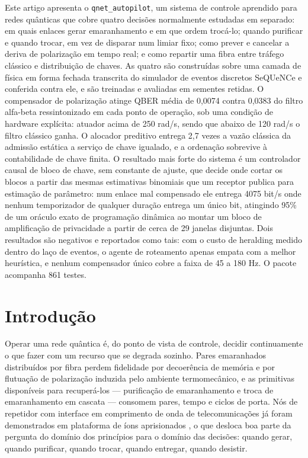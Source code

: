 \documentclass[12pt]{article}
\begin{document}
\begin{resumo}
Este artigo apresenta o \texttt{qnet\_autopilot}, um sistema de controle
aprendido para redes quânticas que cobre quatro decisões normalmente estudadas
em separado: em quais enlaces gerar emaranhamento e em que ordem trocá-lo;
quando purificar e quando trocar, em vez de disparar num limiar fixo; como
prever e cancelar a deriva de polarização em tempo real; e como repartir uma
fibra entre tráfego clássico e distribuição de chaves. As quatro são
construídas sobre uma camada de física em forma fechada transcrita do simulador
de eventos discretos SeQUeNCe e conferida contra ele, e são treinadas e
avaliadas em sementes retidas. O compensador de polarização atinge QBER média
de 0,0074 contra 0,0383 do filtro alfa-beta ressintonizado em cada ponto de
operação, sob uma condição de hardware explícita: atuador acima de 250 rad/s,
sendo que abaixo de 120 rad/s o filtro clássico ganha. O alocador preditivo
entrega 2,7 vezes a vazão clássica da admissão estática a serviço de chave
igualado, e a ordenação sobrevive à contabilidade de chave finita. O resultado
mais forte do sistema é um controlador causal de bloco de chave, sem constante
de ajuste, que decide onde cortar os blocos a partir das mesmas estimativas
binomiais que um receptor publica para estimação de parâmetro: num enlace mal
compensado ele entrega 4075 bit/s onde nenhum temporizador de qualquer duração
entrega um único bit, atingindo 95\% de um oráculo exato de programação
dinâmica ao montar um bloco de amplificação de privacidade a partir de cerca de
29 janelas disjuntas. Dois resultados são negativos e reportados como tais: com
o custo de heralding medido dentro do laço de eventos, o agente de roteamento
apenas empata com a melhor heurística, e nenhum compensador único cobre a faixa
de 45 a 180 Hz. O pacote acompanha 861 testes.
\end{resumo}


\section{Introdução}

Operar uma rede quântica é, do ponto de vista de controle, decidir
continuamente o que fazer com um recurso que se degrada sozinho. Pares
emaranhados distribuídos por fibra perdem fidelidade por decoerência de memória
e por flutuação de polarização induzida pelo ambiente termomecânico, e as
primitivas disponíveis para recuperá-los --- purificação de emaranhamento
\cite{bennett1996,deutsch1996} e troca de emaranhamento em cascata
\cite{briegel1998} --- consomem pares, tempo e ciclos de porta. Nós de repetidor
com interface em comprimento de onda de telecomunicações já foram demonstrados
em plataforma de íons aprisionados \cite{krutyanskiy2023}, o que desloca boa
parte da pergunta do domínio dos princípios para o domínio das decisões: quando
gerar, quando purificar, quando trocar, quando entregar, quando desistir.
\end{document}
